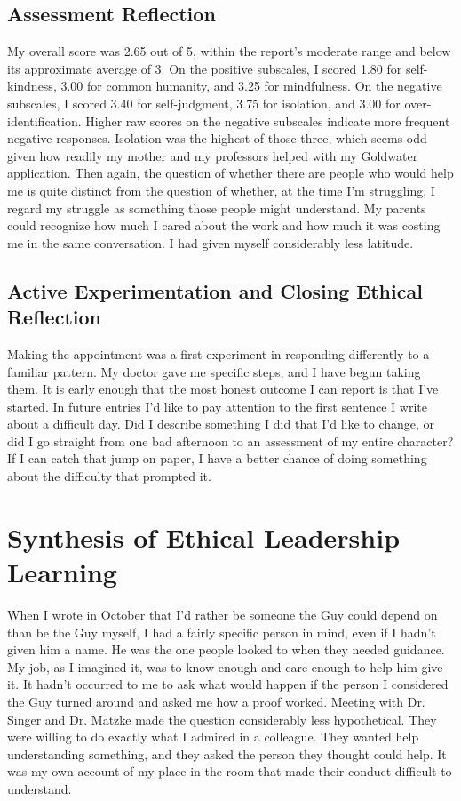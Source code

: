 \documentclass[12pt,letterpaper]{article}
\newcommand{\entry}[1]{\clearpage\section{#1}}
\begin{document}
\subsection{Assessment Reflection}
My overall score was 2.65 out of 5, within the report's moderate range and below its approximate average of 3. On the positive subscales, I scored 1.80 for self-kindness, 3.00 for common humanity, and 3.25 for mindfulness. On the negative subscales, I scored 3.40 for self-judgment, 3.75 for isolation, and 3.00 for over-identification. Higher raw scores on the negative subscales indicate more frequent negative responses. Isolation was the highest of those three, which seems odd given how readily my mother and my professors helped with my Goldwater application. Then again, the question of whether there are people who would help me is quite distinct from the question of whether, at the time I'm struggling, I regard my struggle as something those people might understand. My parents could recognize how much I cared about the work and how much it was costing me in the same conversation. I had given myself considerably less latitude.

\subsection{Active Experimentation and Closing Ethical Reflection}
Making the appointment was a first experiment in responding differently to a familiar pattern. My doctor gave me specific steps, and I have begun taking them. It is early enough that the most honest outcome I can report is that I've started. In future entries I'd like to pay attention to the first sentence I write about a difficult day. Did I describe something I did that I'd like to change, or did I go straight from one bad afternoon to an assessment of my entire character? If I can catch that jump on paper, I have a better chance of doing something about the difficulty that prompted it.

\entry{Synthesis of Ethical Leadership Learning}
When I wrote in October that I'd rather be someone the Guy could depend on than be the Guy myself, I had a fairly specific person in mind, even if I hadn't given him a name. He was the one people looked to when they needed guidance. My job, as I imagined it, was to know enough and care enough to help him give it. It hadn't occurred to me to ask what would happen if the person I considered the Guy turned around and asked me how a proof worked. Meeting with Dr. Singer and Dr. Matzke made the question considerably less hypothetical. They were willing to do exactly what I admired in a colleague. They wanted help understanding something, and they asked the person they thought could help. It was my own account of my place in the room that made their conduct difficult to understand.
\end{document}
